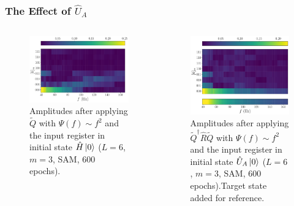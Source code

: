 \documentclass{beamer}
\begin{document}
\begin{frame}
\frametitle{The Effect of $\hat{U}_A$}
\begin{columns}
\begin{column}{0.5\textwidth}
\begin{figure}
\centering 
\includegraphics[width=\textwidth]{im/Q_amp_quadratic_UA}
\caption{Amplitudes after applying $\tilde{Q}$ with $\Psi(f) \sim f^2$ and the input register in initial state $\hat{H} \ket{0}$ ($L=6$, $m=3$, SAM, 600 epochs). }
\end{figure}
\end{column}
\begin{column}{0.5\textwidth}
\begin{figure}
\centering 
\includegraphics[width=\textwidth]{im/QRQ_amp_quadratic_UA}
\caption{Amplitudes after applying $\tilde{Q}^\dagger \hat{R} \tilde{Q}$ with $\Psi(f) \sim f^2$ and the input register in initial state $\hat{U}_A \ket{0}$ ($L=6$, $m=3$, SAM, 600 epochs).Target state added for reference. }
\end{figure}
\end{column}
\end{columns}
\end{frame}
\end{document}
